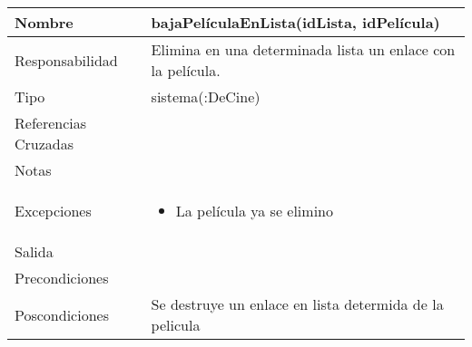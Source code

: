 \documentclass{article}
\begin{document}
\begin{table}[h]
\begin{tabular}{|l|l|l|l|l|l|}
\hline
\multicolumn{2}{|p{3cm}|}{Nombre} & \multicolumn{4}{p{10cm}|}{\textbf{bajaPelículaEnLista(idLista, idPelícula)}}\\
\hline
\multicolumn{2}{|p{3cm}|}{Responsabilidad} & \multicolumn{4}{p{10cm}|}{Elimina en una determinada lista un enlace con la película.} \\
\hline
\multicolumn{2}{|p{3cm}|}{Tipo} & \multicolumn{4}{p{10cm}|}{sistema(:DeCine)} \\
\hline
\multicolumn{2}{|p{3cm}|}{Referencias Cruzadas} & \multicolumn{4}{p{10cm}|}{} \\
\hline
\multicolumn{2}{|p{3cm}|}{Notas} & \multicolumn{4}{p{10cm}|}{} \\
\hline
\multicolumn{2}{|p{3cm}|}{Excepciones} & \multicolumn{4}{p{10cm}|}{\begin{itemize}
\item La película ya se elimino
\end{itemize}} \\
\hline
\multicolumn{2}{|p{3cm}|}{Salida} & \multicolumn{4}{p{10cm}|}{} \\
\hline
\multicolumn{2}{|p{3cm}|}{Precondiciones} & \multicolumn{4}{p{10cm}|}{} \\
\hline
\multicolumn{2}{|p{3cm}|}{Poscondiciones} & \multicolumn{4}{p{10cm}|}{Se destruye un enlace en lista determida de la pelicula} \\
\hline
\end{tabular}
\end{table}
\end{document}
